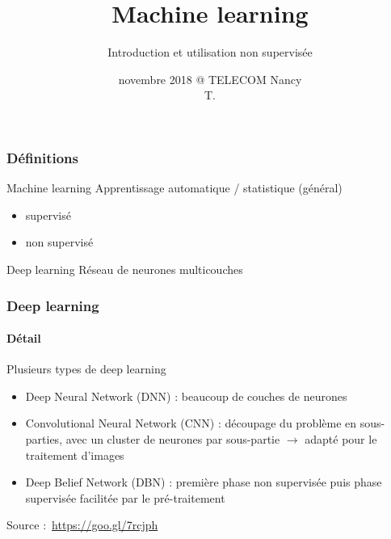 \documentclass[]{beamer}
\begin{document}
\title{Machine learning}
\subtitle{Introduction et utilisation non supervisée}
\author{novembre 2018 @ TELECOM Nancy\\T. }
\date{}

\begin{frame}
  \titlepage{}
\end{frame}


\begin{frame}
  \frametitle{Définitions}
  \begin{block}{Machine learning}
    Apprentissage automatique / statistique (général)
    \begin{itemize}
      \item supervisé
      \item non supervisé
    \end{itemize}
  \end{block}

  \begin{exampleblock}{Deep learning}
    Réseau de neurones multicouches
  \end{exampleblock}
\end{frame}

\begin{frame}
  \frametitle{Deep learning}
  \framesubtitle{Détail}
  \begin{block}{Plusieurs types de deep learning}
    \begin{itemize}
      \item Deep Neural Network (DNN) : beaucoup de couches de neurones
      \item Convolutional Neural Network (CNN) : découpage du problème en sous-parties, avec un cluster de neurones par sous-partie $\to$ adapté pour le traitement d'images
      \item Deep Belief Network (DBN) : première phase non supervisée puis phase supervisée facilitée par le pré-traitement
    \end{itemize}
  \end{block}

  \alert{Source :}~\url{https://goo.gl/7rcjph}
\end{frame}
\end{document}
